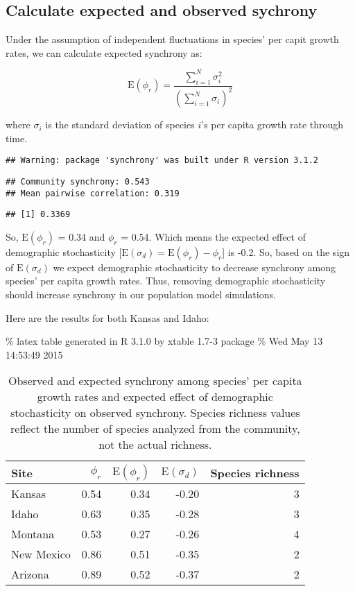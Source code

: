 \documentclass[12pt,]{article}
\begin{document}
\subsection{Calculate expected and observed
sychrony}\label{calculate-expected-and-observed-sychrony}

Under the assumption of independent fluctuations in species' per capit
growth rates, we can calculate expected synchrony as:

\[\text{E}(\phi_{r}) = \frac{ \sum_{i=1}^{N}{\sigma_{i}^2} } { \left(\sum_{i=1}^{N}{\sigma_{i}} \right)^2 }\]

where \(\sigma_{i}\) is the standard deviation of species \(i\)'s per
capita growth rate through time.

\begin{verbatim}
## Warning: package 'synchrony' was built under R version 3.1.2
\end{verbatim}

\begin{verbatim}
## Community synchrony: 0.543
## Mean pairwise correlation: 0.319
\end{verbatim}

\begin{verbatim}
## [1] 0.3369
\end{verbatim}

So, \(\text{E}(\phi_{r})\) = 0.34 and \(\phi_{r}\) = 0.54. Which means
the expected effect of demographic stochasticity
{[}\(\text{E}(\sigma_{d}) = \text{E}(\phi_{r}) - \phi_{r}\){]} is -0.2.
So, based on the sign of \(\text{E}(\sigma_{d})\) we expect demographic
stochasticity to decrease synchrony among species' per capita growth
rates. Thus, removing demographic stochasticity should increase
synchrony in our population model simulations.

Here are the results for both Kansas and Idaho:

\% latex table generated in R 3.1.0 by xtable 1.7-3 package \% Wed May
13 14:53:49 2015

\begin{table}[ht]
\centering
\caption{Observed and expected synchrony among species' per capita growth rates and expected effect of demographic stochasticity on observed synchrony. Species richness values reflect the number of species analyzed from the community, not the actual richness.} 
\begin{tabular}{lrrrr}
  \hline
Site & $\phi_{r}$ & $\text{E}(\phi_{r})$ & $\text{E}(\sigma_{d})$ & Species richness \\ 
  \hline
Kansas & 0.54 & 0.34 & -0.20 &   3 \\ 
  Idaho & 0.63 & 0.35 & -0.28 &   3 \\ 
  Montana & 0.53 & 0.27 & -0.26 &   4 \\ 
  New Mexico & 0.86 & 0.51 & -0.35 &   2 \\ 
  Arizona & 0.89 & 0.52 & -0.37 &   2 \\ 
   \hline
\end{tabular}
\end{table}
\end{document}

